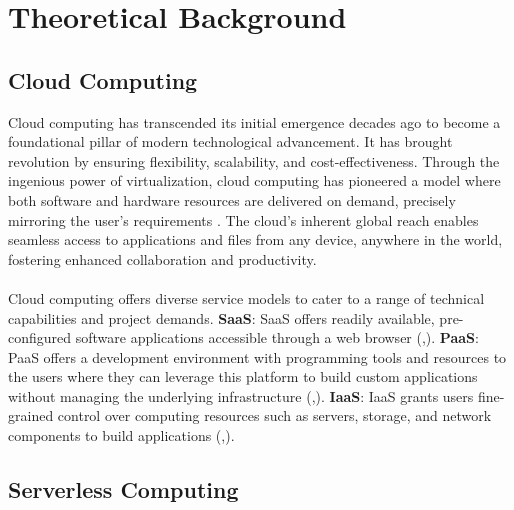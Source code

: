 %
\section{Theoretical Background}\label{sec:theoretical background}
%
\subsection {Cloud Computing}
Cloud computing has transcended its initial emergence decades ago to become a foundational pillar of modern technological advancement. It has brought revolution by ensuring flexibility, scalability, and cost-effectiveness. Through the ingenious power of virtualization, cloud computing has pioneered a model where both software and hardware resources are delivered on demand, precisely mirroring the user's requirements \cite{Chou15}. The cloud's inherent global reach enables seamless access to applications and files from any device, anywhere in the world, fostering enhanced collaboration and productivity\cite{NIST}.\\\\
Cloud computing offers diverse service models to cater to a range of technical capabilities and project demands. 
\textbf {\ac{SaaS}}: SaaS offers readily available, pre-configured software applications accessible through a web browser (\cite{Odu18},\cite{ HBS21}). 
\textbf {\ac{PaaS}}: PaaS offers a development environment with programming tools and resources to the users where they can leverage this platform to build custom applications without managing the underlying infrastructure (\cite{Odu18},\cite{ HBS21}). 
\textbf {\ac{IaaS}}: IaaS grants users fine-grained control over computing resources such as servers, storage, and network components to build applications (\cite{Odu18},\cite{ HBS21}). \\

\subsection {Serverless Computing}
